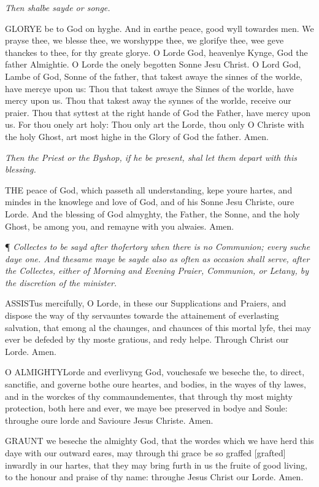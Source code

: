 \emph{Then
shalbe sayde or songe.}

GLORYE
be to God on hyghe. And in earthe peace, good wyll towardes men. We prayse
thee, we blesse thee, we worshyppe thee, we glorifye thee, wee geve thanckes
to thee, for thy greate glorye. O Lorde God, heavenlye Kynge, God the
father Almightie. O Lorde the onely begotten Sonne Jesu Christ. O Lord
God, Lambe of God, Sonne of the father, that takest awaye the sinnes of
the worlde, have mercye upon us: Thou that takest awaye the Sinnes of
the worlde, have mercy upon us. Thou that takest away the synnes of the
worlde, receive our praier. Thou that syttest at the right hande of God
the Father, have mercy upon us. For thou onely art holy: Thou only art
the Lorde, thou only O Christe with the holy Ghost, art most highe in
the Glory of God the father. Amen.

\emph{Then
the Priest or the Byshop, if he be present, shal let them depart with
this blessing.}

THE
peace of God, which passeth all understanding, kepe youre hartes, and
mindes in the knowlege and love of God, and of his Sonne Jesu Christe,
oure Lorde. And the blessing of God almyghty, the Father, the Sonne, and
the holy Ghost, be among you, and remayne with you alwaies. Amen.

¶ \emph{Collectes
to be sayd after thofertory when there is no Communion; every suche daye
one. And thesame maye be sayde also as often as occasion shall serve,
after the Collectes, either of Morning and Evening Praier, Communion,
or Letany, by the discretion of the minister.}

ASSIST\textbf{}us mercifully, O Lorde, in these our Supplications and Praiers, and
dispose the way of thy servauntes towarde the attainement of everlasting
salvation, that emong al the chaunges, and chaunces of this mortal lyfe,
thei may ever be defeded by thy moste gratious, and redy helpe. Through
Christ our Lorde. Amen.

O
ALMIGHTY\textbf{}Lorde and everlivyng God, vouchesafe we beseche the, to
direct, sanctifie, and governe bothe oure heartes, and bodies, in the
wayes of thy lawes, and in the worckes of thy commaundementes, that through
thy most mighty protection, both here and ever, we maye bee preserved
in bodye and Soule: throughe oure lorde and Savioure Jesus Christe. Amen.

GRAUNT
we beseche the almighty God, that the wordes which we have herd this daye
with our outward eares, may through thi grace be so graffed [grafted]
inwardly in our hartes, that they may bring furth in us the fruite of
good living, to the honour and praise of thy name: throughe Jesus Christ
our Lorde. Amen.

